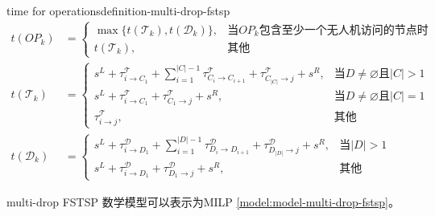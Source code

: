 \begin{definition}{time for operations}{definition-multi-drop-fstsp}
    \begin{align}
        t(OP_k) &= 
        \begin{cases}
            \max\{t(\mathscr{T}_k), t(\mathscr{D}_k)\}, & \text{当} OP_k \text{包含至少一个无人机访问的节点时} \\
            t(\mathscr{T}_k), & \text{其他}
        \end{cases}\label{eq:multi-drop-fstsp-operation-time-1}\\
        t(\mathscr{T}_k) &= 
        \begin{cases}
            s^L + \tau_{i \to C_1}^{\mathscr{T}} + \sum_{i=1}^{\lvert C\rvert - 1} \tau_{C_i \to C_{i+1}}^{\mathscr{T}} + \tau_{C_{\lvert C\rvert} \to j}^{\mathscr{T}} + s^R, & \text{当} D \neq \varnothing \text{且} \lvert C\rvert > 1 \\
            s^L + \tau_{i \to C_1}^{\mathscr{T}} + \tau_{C_1 \to j}^{\mathscr{T}} + s^R, & \text{当} D \neq \varnothing \text{且} \lvert C\rvert = 1 \\
            \tau_{i \to j}^{\mathscr{T}}, & \text{其他} 
        \end{cases}\label{eq:multi-drop-fstsp-operation-time-2}\\
        t(\mathscr{D}_k) &= 
        \begin{cases}
            s^L + \tau_{i \to D_1}^{\mathscr{D}} + \sum_{i=1}^{\lvert D\rvert -1} \tau_{D_i \to D_{i+1}}^{\mathscr{D}} + \tau_{D_{\lvert D\rvert} \to j}^{\mathscr{D}} + s^R, & \text{当} \lvert D\rvert > 1 \\
            s^L + \tau_{i \to D_1}^{\mathscr{D}} + \tau_{D_1 \to j}^{\mathscr{D}} + s^R, & \text{其他} 
        \end{cases}\label{eq:multi-drop-fstsp-operation-time-3}
    \end{align}
\end{definition}

multi-drop FSTSP 数学模型可以表示为MILP \ref{model:model-multi-drop-fstsp}。

